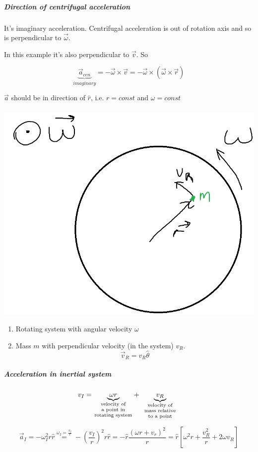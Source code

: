 \subparagraph{Direction of centrifugal acceleration}

It's imaginary acceleration. Centrifugal acceleration is out of rotation axis and so is perpendicular to $\vec{\omega}$.

In this example it's also perpendicular to $\vec{v}$. So 

$$\underbrace{\vec{a}_{cen}}_{imaginary} = -\vec{\omega} \times \vec{v} = - \vec{\omega} \times \left( \vec{\omega} \times \vec{r} \right)$$

$\vec{a}$ should be in direction of $\hat{r}$, i.e. $r = const$ and $\omega = const$

\paragraph{}
\begin{center}
	\includegraphics[width=0.5\linewidth]{./lect6/pic2.png}
\end{center}

\begin{enumerate}
	\item Rotating system with angular velocity $\omega$
	\item Mass $m$ with perpendicular velocity (in the system) $v_R$.
	$$\vec{v}_R = v_R \hat{\theta}$$
\end{enumerate}

\subparagraph{Acceleration in inertial system}

$$v_I = \underbrace{\omega r}_{\parbox{2cm}{\scriptsize  \centering  velocity of\\ a point in\\rotating system}} +  \underbrace{v_R}_{\parbox{2cm}{\scriptsize  \centering  velocity of \\ mass relative \\ to a point}}$$

$$\vec{a}_I = -\omega^2_I r \hat{r} \stackrel{\omega_I = \frac{v_I}{r}}{=} -\left(\frac{v_I}{r}\right)^2r\hat{r} = -\hat{r} \frac{\left( \omega r + v_r \right)^2}{r} = \hat{r} \left[ \omega^2 r + \frac{v_R^2}{r} + 2\omega v_R \right]$$

